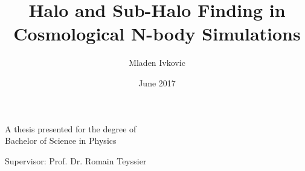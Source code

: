 
\title{\Huge Halo and Sub-Halo Finding in Cosmological N-body Simulations}
\author{Mladen Ivkovic}
\date{June 2017}


	
\maketitle

\begin{center}
	A thesis presented for the degree of\\
	Bachelor of Science in Physics
	
	\vspace{1cm}
	Supervisor: Prof. Dr. Romain Teyssier
	
\end{center}
\vfill
\thispagestyle{empty}
\clearpage

\newpage~\thispagestyle{empty}\newpage
\tableofcontents
\clearpage